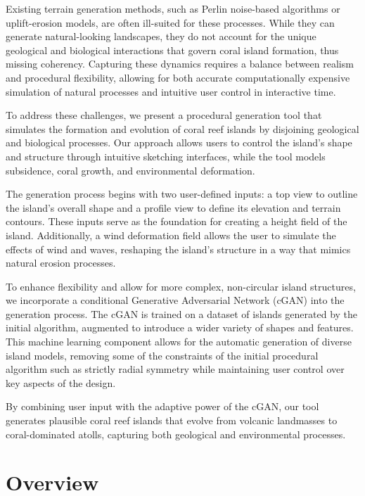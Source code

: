 Existing terrain generation methods, such as Perlin noise-based algorithms or uplift-erosion models, are often ill-suited for these processes. While they can generate natural-looking landscapes, they do not account for the unique geological and biological interactions that govern coral island formation, thus missing coherency. Capturing these dynamics requires a balance between realism and procedural flexibility, allowing for both accurate computationally expensive simulation of natural processes and intuitive user control in interactive time.

%

To address these challenges, we present a procedural generation tool that simulates the formation and evolution of coral reef islands by disjoining geological and biological processes. Our approach allows users to control the island's shape and structure through intuitive sketching interfaces, while the tool models subsidence, coral growth, and environmental deformation.

The generation process begins with two user-defined inputs: a top view to outline the island's overall shape and a profile view to define its elevation and terrain contours. These inputs serve as the foundation for creating a height field of the island. Additionally, a wind deformation field allows the user to simulate the effects of wind and waves, reshaping the island's structure in a way that mimics natural erosion processes.

To enhance flexibility and allow for more complex, non-circular island structures, we incorporate a conditional Generative Adversarial Network (cGAN) into the generation process. The cGAN is trained on a dataset of islands generated by the initial algorithm, augmented to introduce a wider variety of shapes and features. This machine learning component allows for the automatic generation of diverse island models, removing some of the constraints of the initial procedural algorithm such as strictly radial symmetry while maintaining user control over key aspects of the design.

By combining user input with the adaptive power of the cGAN, our tool generates plausible coral reef islands that evolve from volcanic landmasses to coral-dominated atolls, capturing both geological and environmental processes.



\section{Overview}

